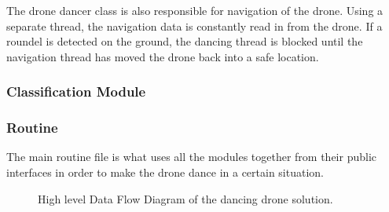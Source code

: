 The drone dancer class is also responsible for navigation of the drone. Using a separate thread, the navigation
data is constantly read in from the drone. If a roundel is detected on the ground, the dancing thread is blocked
until the navigation thread has moved the drone back into a safe location.

\subsubsection{Classification Module}


\subsubsection{Routine}
The main routine file is what uses all the modules together from their public interfaces in order to make the
drone dance in a certain situation.

\onecolumn
\begin{figure*}[h]

\caption{High level Data Flow Diagram of the dancing drone solution.}
\end{figure*}

\begin{multicols}{2}
\twocolumn

\end{multicols}
\clearpage
